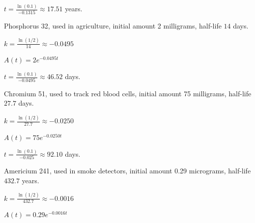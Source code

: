 \documentclass{ximera}
\begin{document}
\begin{question}
\begin{problem}
\begin{solution}
    $t = \frac{\ln(0.1)}{-0.1315} \approx 17.51$ years.
\end{solution}
    
\end{problem}

\begin{problem}
    Phosphorus 32, used in agriculture, initial amount 2 milligrams, half-life $14$ days.

\begin{solution}
     $k = \frac{\ln(1/2)}{14} \approx -0.0495$
\end{solution}

\begin{solution}
    $A(t) = 2e^{-0.0495t}$
\end{solution}

\begin{solution}
     $t = \frac{\ln(0.1)}{-0.0495} \approx 46.52$ days.
\end{solution}
    
\end{problem}

\begin{problem}
    Chromium 51, used to track red blood cells, initial amount 75 milligrams, half-life  $27.7$ days.

\begin{solution}
    $k = \frac{\ln(1/2)}{27.7} \approx -0.0250$
\end{solution}

\begin{solution}
    $A(t) = 75e^{-0.0250t}$
\end{solution}

\begin{solution}
    $t = \frac{\ln(0.1)}{-0.025} \approx 92.10$ days.
\end{solution}
    
\end{problem}

\begin{problem}
    Americium 241, used in smoke detectors, initial amount 0.29 micrograms, half-life $432.7$ years.

\begin{solution}
    $k = \frac{\ln(1/2)}{432.7} \approx -0.0016$
\end{solution}

\begin{solution}
    $A(t) = 0.29e^{-0.0016t}$
\end{solution}


\end{problem}
\end{question}
\end{document}
